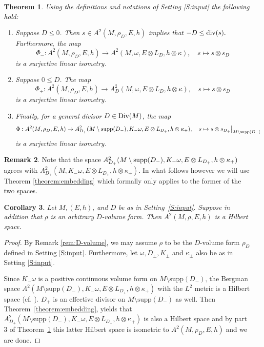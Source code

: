 \documentclass[11pt]{amsart}
\newtheorem{theorem}{Theorem}[section]
\newtheorem{corollary}[theorem]{Corollary}
\theoremstyle{definition}
\newtheorem{remark}[theorem]{Remark}
\begin{document}
\begin{theorem}\label{thm:Phiisom}
Using the definitions and notations of Setting \ref{S:input} the following hold:
 
 \begin{enumerate}
     \item 
  Suppose  $D\le0$. Then $s\in A^2(M,\rho_D,E,h)$ implies that $ 
 -D\le \text{\normalfont div}(s).$ Furthermore, the map
 $$
 \Phi_-:A^2(M,\rho_D,E,h)
 \rightarrow A^2(M,\omega,E\otimes L_D, h\otimes\kappa),\quad s\mapsto s\otimes s_D
 $$
 is a surjective linear isometry.

\item Suppose  $0\le D$. The 
 map
$$\Phi_+:A^2(M,\rho_D,E,h)
 \rightarrow A^2_D(M,\omega,E\otimes L_D, h\otimes\kappa),\quad s\mapsto s\otimes s_D
 $$
 is a surjective linear isometry.
 \item Finally, for a general divisor $D \in \text{\normalfont Div}(M)$, the map $$\Phi : A^2(M,\rho_D,E,h) \to A^2_{D_+}(M \setminus \text{\normalfont supp}(D_-), K_-\omega, E\otimes L_{D_+}, h \otimes \kappa_+ ), \quad s \mapsto s\otimes s_{D_+}\big|_{M \setminus \text{\normalfont supp}(D_-)}$$ is a surjective linear isometry.
 
 \end{enumerate}
\end{theorem}

\begin{remark} Note that the space $ A^2_{D_+}(M \setminus \text{\normalfont supp}(D_-), K_-\omega, E\otimes L_{D_+}, h \otimes \kappa_+ )$ agrees with $ A^2_{D_+}(M, K_-\omega, E\otimes L_{D_+}, h \otimes \kappa_+ )$. In what follows however we will use Theorem \ref{theorem:embedding} which formally only applies to the former of the two spaces. \end{remark}


 
\begin{corollary}\label{cor:simagyokos}
    Let $M, (E,h)$, and $D$  be as in Setting~\ref{S:input}. Suppose in addition that $\rho$ is an arbitrary $D$-volume form. Then  $A^2(M,\rho,E,h)$ is a Hilbert space.
\end{corollary}

\begin{proof}
    By Remark \ref{rem:D-volume}, we may assume $\rho$ to be the $D$-volume form $\rho_D$ defined in Setting \ref{S:input}. Furthermore, let $\omega, D_{\pm}, K_{\pm}$ and $\kappa_{\pm}$ also be as in Setting \ref{S:input}.
    
    Since $K_-\omega$ is a positive continuous volume form on $M\setminus\text{supp}(D_-)$, 
    the Bergman space
 $A^2(M\setminus\text{supp}(D_-),K_-\omega,E\otimes L_{D_+}, h\otimes \kappa_+)$ with the $L^2$ metric is a Hilbert space (cf. \cite{PW94}). $D_+$
 is an effective divisor on $M\setminus\text{supp}(D_-)$ as well.  Then  Theorem~\ref{theorem:embedding}, 
 yields that 
 $A^2_{D_+}(M\setminus\text{supp}(D_-), K_-\omega,E\otimes L_{D_+}, h\otimes \kappa_+)$ is also a Hilbert space and by part 3 of Theorem~\ref{thm:Phiisom} 
 this latter Hilbert space is isometric to $A^2(M,\rho_D,E,h)$ and we are done.
\end{proof}
\end{document}
